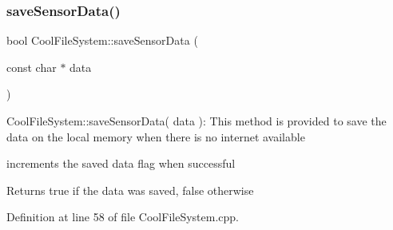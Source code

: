 \subsubsection{\texorpdfstring{save\+Sensor\+Data()}{saveSensorData()}}
{\footnotesize\ttfamily bool Cool\+File\+System\+::save\+Sensor\+Data (\begin{DoxyParamCaption}\item[{const char $\ast$}]{data }\end{DoxyParamCaption})}

Cool\+File\+System\+::save\+Sensor\+Data( data )\+: This method is provided to save the data on the local memory when there is no internet available

increments the saved data flag when successful

\begin{DoxyReturn}{Returns}
true if the data was saved, false otherwise 
\end{DoxyReturn}


Definition at line 58 of file Cool\+File\+System.\+cpp.



